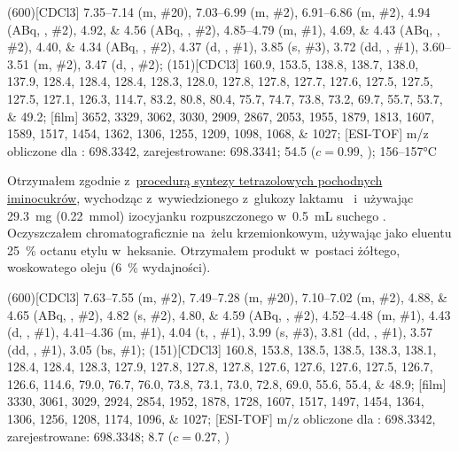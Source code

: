 \begin{fullexp}
	\NMR(600)[CDCl3] \numrange{7.35}{7.14} (m, \#{20}), \numrange{7.03}{6.99} (m, \#{2}), \numrange{6.91}{6.86} (m, \#{2}), \num{4.94} (ABq, , \#{2}), \numlist{4.92;4.56} (ABq, , \#{2}), \numrange{4.85}{4.79} (m, \#{1}), \numlist{4.69;4.43} (ABq, , \#{2}), \numlist{4.40;4.34} (ABq, , \#{2}), \num{4.37} (d, , \#{1}), \num{3.85} (s, \#{3}), \num{3.72} (dd, , \#{1}), \numrange{3.60}{3.51} (m, \#{2}), \num{3.47} (d, , \#{2});
	(151)[CDCl3] \numlist{160.9; 153.5; 138.8; 138.7; 138.0; 137.9; 128.4; 128.4; 128.4; 128.3; 128.0; 127.8; 127.8; 127.7; 127.6; 127.5; 127.5; 127.5; 127.1; 126.3; 114.7; 83.2; 80.8; 80.4; 75.7; 74.7; 73.8; 73.2; 69.7; 55.7; 53.7; 49.2};
	[film] \numlist{3652; 3329; 3062; 3030; 2909; 2867; 2053; 1955; 1879; 1813; 1607; 1589; 1517; 1454; 1362; 1306; 1255; 1209; 1098; 1068; 1027};
	[ESI-TOF] m/z obliczone dla : \num{698.3342}, zarejestrowane: \num{698.3341};
	\data{[$\alpha^{23}_D$]~$=$} \num{54.5} ($c = 0.99$, );
	 \numrange{156}{157}\si{\celsius}
\end{fullexp}

Otrzymałem zgodnie z~\hyperref[experimental:sugars:schwartz]{procedurą syntezy tetrazolowych
	pochodnych iminocukrów}, wychodząc z~wywiedzionego z~glukozy laktamu~
	i~używając \SI{29.3}{\milli\gram} (\SI{0.22}{\milli\mol}) izocyjanku 
	rozpuszczonego w~\SI{0.5}{\milli\liter} suchego .
Oczyszczałem chromatograficznie na~żelu krzemionkowym,
	używając jako eluentu \SI{25}{\percent} octanu etylu w~heksanie.
Otrzymałem produkt w~postaci żółtego, woskowatego oleju (\SI{6}{\percent} wydajności).

\begin{fullexp}
	\NMR(600)[CDCl3] \numrange{7.63}{7.55} (m, \#{2}), \numrange{7.49}{7.28} (m, \#{20}), \numrange{7.10}{7.02} (m, \#{2}), \numlist{4.88;4.65} (ABq, , \#{2}), \num{4.82} (s, \#{2}), \numlist{4.80;4.59} (ABq, , \#{2}), \numrange{4.52}{4.48} (m, \#{1}), \num{4.43} (d, , \#{1}), \numrange{4.41}{4.36} (m, \#{1}), \num{4.04} (t, , \#{1}), \num{3.99} (s, \#{3}), \num{3.81} (dd, , \#{1}), \num{3.57} (dd, , \#{1}), \num{3.05} (bs, \#{1});
	(151)[CDCl3] \numlist{160.8; 153.8; 138.5; 138.5; 138.3; 138.1; 128.4; 128.4; 128.3; 127.9; 127.8; 127.8; 127.8; 127.6; 127.6; 127.6; 127.5; 126.7; 126.6; 114.6; 79.0; 76.7; 76.0; 73.8; 73.1; 73.0; 72.8; 69.0; 55.6; 55.4; 48.9};
	[film] \numlist{3330; 3061; 3029; 2924; 2854; 1952; 1878; 1728; 1607; 1517; 1497; 1454; 1364; 1306; 1256; 1208; 1174; 1096; 1027};
	[ESI-TOF] m/z obliczone dla : \num{698.3342}, zarejestrowane: \num{698.3348};
	\data{[$\alpha^{23}_D$]~$=$} \num{8.7} ($c = 0.27$, )
\end{fullexp}


